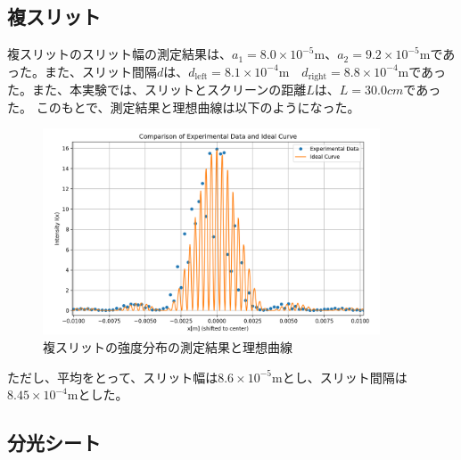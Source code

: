 \documentclass[a4paper,11pt]{jsarticle}
\begin{document}
\subsection{複スリット}
複スリットのスリット幅の測定結果は、$a_{1} = 8.0 \times 10^{-5} \si{\meter}$、$a_{2} = 9.2 \times 10^{-5} \si{\meter}$であった。また、スリット間隔$d$は、$d_{\text{left}} = 8.1 \times 10^{-4} \si{ \meter} \quad d_{\text{right}}= 8.8 \times 10^{-4}\si{\meter}$であった。また、本実験では、スリットとスクリーンの距離$L$は、$L=30.0 \si{cm}$であった。
このもとで、測定結果と理想曲線は以下のようになった。
\begin{figure}[H]
    \begin{center}
    \includegraphics[width=100mm]{huku.png}
    \end{center}
    \caption{複スリットの強度分布の測定結果と理想曲線}
    \label{fig:huku1}
\end{figure}
ただし、平均をとって、スリット幅は$8.6 \times 10^{-5}\si{\meter}$とし、スリット間隔は$8.45\times 10^{-4}\si{\meter}$とした。

\subsection{分光シート}
\end{document}
